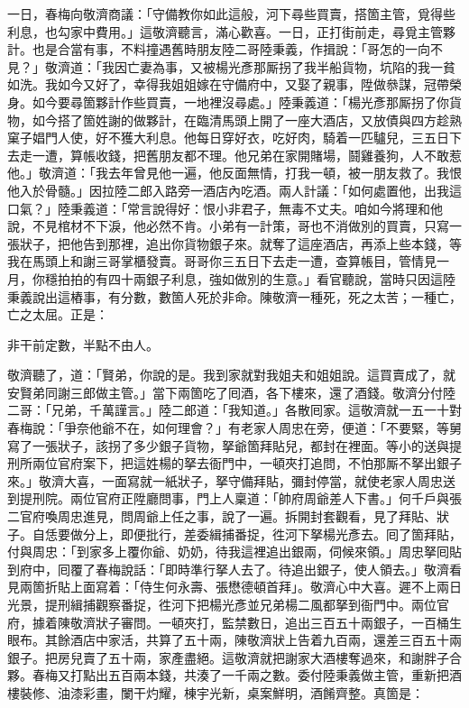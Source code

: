一日，春梅向敬濟商議：「守備教你如此這般，河下尋些買賣，搭箇主管，覓得些利息，也勾家中費用。」這敬濟聽言，滿心歡喜。一日，正打街前走，尋覓主管夥計。也是合當有事，不料撞遇舊時朋友陸二哥陸秉義，作揖說：「哥怎的一向不見？」敬濟道：「我因亡妻為事，又被楊光彥那厮拐了我半船貨物，坑陷的我一貧如洗。我如今又好了，幸得我姐姐嫁在守備府中，又娶了親事，陞做叅謀，冠帶榮身。如今要尋箇夥計作些買賣，一地裡沒尋處。」陸秉義道：「楊光彥那厮拐了你貨物，如今搭了箇姓謝的做夥計，在臨清馬頭上開了一座大酒店，又放債與四方趁熟窠子娼門人使，好不獲大利息。他每日穿好衣，吃好肉，騎着一匹驢兒，三五日下去走一遭，算帳收錢，把舊朋友都不理。{}他兄弟在家開賭場，鬪雞養狗，人不敢惹他。」敬濟道：「我去年曾見他一遍，他反面無情，打我一頓，被一朋友救了。我恨他入於骨髓。」因拉陸二郎入路旁一酒店內吃酒。兩人計議：「如何處置他，出我這口氣？」陸秉義道：「常言說得好：恨小非君子，無毒不丈夫。咱如今將理和他說，不見棺材不下淚，他必然不肯。小弟有一計策，哥也不消做別的買賣，只寫一張狀子，把他告到那裡，追出你貨物銀子來。就奪了這座酒店，再添上些本錢，等我在馬頭上和謝三哥掌櫃發賣。哥哥你三五日下去走一遭，查算帳目，管情見一月，你穩拍拍的有四十兩銀子利息，強如做別的生意。」{}看官聽說，當時只因這陸秉義說出這樁事，有分數，數箇人死於非命。陳敬濟一種死，死之太苦；一種亡，亡之太屈。正是：

非干前定數，半點不由人。

敬濟聽了，道：「賢弟，你說的是。我到家就對我姐夫和姐姐說。這買賣成了，就安賢弟同謝三郎做主管。」當下兩箇吃了囘酒，各下樓來，還了酒錢。敬濟分付陸二哥：「兄弟，千萬謹言。」陸二郎道：「我知道。」各散囘家。這敬濟就一五一十對春梅說：「爭奈他爺不在，如何理會？」有老家人周忠在旁，便道：「不要緊，等舅寫了一張狀子，該拐了多少銀子貨物，拏爺箇拜貼兒，都封在裡面。等小的送與提刑所兩位官府案下，把這姓楊的拏去衙門中，一頓夾打追問，不怕那厮不拏出銀子來。」{}敬濟大喜，一面寫就一紙狀子，拏守備拜貼，彌封停當，就使老家人周忠送到提刑院。兩位官府正陞廳問事，門上人稟道：「帥府周爺差人下書。」何千戶與張二官府喚周忠進見，問周爺上任之事，說了一遍。拆開封套觀看，見了拜貼、狀子。自恁要做分上，即便批行，差委緝捕番捉，徃河下拏楊光彥去。囘了箇拜貼，付與周忠：「到家多上覆你爺、奶奶，待我這裡追出銀兩，伺候來領。」周忠拏囘貼到府中，囘覆了春梅說話：「即時準行拏人去了。待追出銀子，使人領去。」敬濟看見兩箇折貼上面寫着：「侍生何永壽、張懋德頓首拜」。敬濟心中大喜。遲不上兩日光景，提刑緝捕觀察番捉，徃河下把楊光彥並兄弟楊二風都拏到衙門中。兩位官府，據着陳敬濟狀子審問。一頓夾打，監禁數日，追出三百五十兩銀子，一百桶生眼布。其餘酒店中家活，共算了五十兩，陳敬濟狀上告着九百兩，還差三百五十兩銀子。把房兒賣了五十兩，家產盡絕。這敬濟就把謝家大酒樓奪過來，和謝胖子合夥。春梅又打點出五百兩本錢，共湊了一千兩之數。委付陸秉義做主管，重新把酒樓裝修、油漆彩畫，闌干灼耀，棟宇光新，桌案鮮明，酒餚齊整。真箇是：

